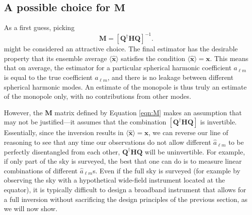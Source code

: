 \documentclass[twocolumn,apj,numberedappendix]{emulateapj}
\newcommand{\y}{\mathbf{y}}
\newcommand{\N}{\mathbf{N}}
\newcommand{\Hmat}{\mathbf{H}}
\newcommand{\Q}{\mathbf{Q}}
\newcommand{\M}{\mathbf{M}}
\begin{document}
\subsection{A possible choice for $\M$}
\label{sec:badMmatrix}
As a first guess, picking
\begin{equation}
\M = [\Q^\dagger \Hmat \Q]^{-1}.
\label{eqn:M}
\end{equation}
might be considered an attractive choice.
The final estimator has the desirable property that its ensemble average $\langle \mathbf{\hat x} \rangle$ satisfies the condition $\langle \mathbf{\hat x} \rangle = \mathbf{x}$. This means that on average, the estimator for a particular spherical harmonic coefficient $\hat{a}_{\ell m}$ is equal to the true coefficient ${a}_{\ell m}$, and there is no leakage between different spherical harmonic modes. An estimate of the monopole is thus truly an estimate of the monopole only, with no contributions from other modes.

However, the $\M$ matrix defined by Equation \eqref{eqn:M} makes an assumption that may not be justified---it assumes that the combination $[\Q^\dagger \Hmat \Q]$ is invertible. Essentially, since the inversion results in $\langle \mathbf{\hat x} \rangle = \mathbf{x}$, we can reverse our line of reasoning to see that any time our observations do not allow different $\hat{a}_{\ell m}$ to be perfectly disentangled from each other, $\Q^\dagger \Hmat \Q$ will be uninvertible. For example, if only part of the sky is surveyed, the best that one can do is to measure linear combinations of different $\hat{a}_{\ell m}$s. Even if the full sky is surveyed (for example by observing the sky with a hypothetical wide-field instrument located at the equator), it is typically difficult to design a broadband instrument that allows for a full inversion without sacrificing the design principles of the previous section, as we will now show.
\end{document}
